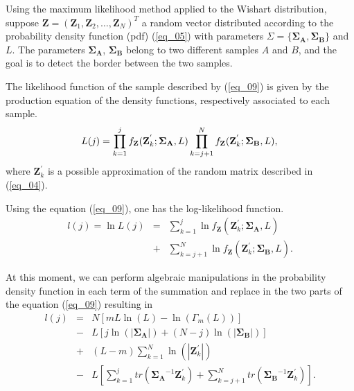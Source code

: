 \documentclass[conference]{IEEEtran}
\begin{document}
Using the maximum likelihood method applied to the Wishart distribution, suppose $\mathbf{Z}=(\mathbf{Z}_1,\mathbf{Z}_2,\dots,\mathbf{Z}_N)^T$ a random vector distributed according to the probability density function (pdf) (\ref{eq_05}) with parameters $\Sigma=\{\mathbf{\Sigma_A}, \mathbf{\Sigma_B}\}$ and $L$. The parameters $\mathbf{\Sigma_A}$, $\mathbf{\Sigma_B}$ belong to two different samples $A$ and $B$, and the goal is to detect the border between the two samples.

The likelihood function of the sample described by (\ref{eq_09}) is given by the production equation of the density functions, respectively associated to each sample.
\begin{equation}\label{eq_10}
	L(j)=\prod_{k=1}^{j}f_{\mathbf{Z}}(\mathbf{Z}_{k}^{'};\mathbf{\Sigma_{A}},L) \prod_{k=j+1}^{N}f_{\mathbf{Z}}(\mathbf{Z}_{k}^{'};\mathbf{\Sigma_{B}},L), \\
\end{equation}
where $\mathbf{Z}_{k}^{'}$ is a possible approximation of the random matrix described in (\ref{eq_04}).

Using the equation (\ref{eq_09}), one has the log-likelihood function.
\begin{equation}
\begin{array}{rcl}\label{eq_11}
	l(j)=\ln L(j)&=&\sum_{k=1}^{j}\ln f_{\mathbf{Z}}(\mathbf{Z}_{k}^{'};\mathbf{\Sigma_{A}},L)\\
	             &+&\sum_{k=j+1}^{N}\ln f_{\mathbf{Z}}(\mathbf{Z}_{k}^{'};\mathbf{\Sigma_{B}},L).
\end{array}
\end{equation}

At this moment, we can perform algebraic manipulations in the probability density function in each term of the summation and replace in the two parts of the equation (\ref{eq_09}) resulting in
\begin{equation}
\begin{array}{lll}\label{eq_12}
	l(j)&=&N\left[mL\ln{\left(L\right)}-\ln{\left(\Gamma_m(L)\right)}\right]\\
	&-& L\left[j\ln{\left(|\mathbf{\Sigma_{A}}|\right)}+(N-j)\ln{\left(|\mathbf{\Sigma_{B}}|\right)}\right] \\
	&+&(L-m)\sum_{k=1}^{N}\ln{\left(|\mathbf{Z}_{k}^{'}|\right)}\\
	&-&L\left[\sum_{k=1}^{j}tr(\mathbf{\Sigma_{A}}^{-1}\mathbf{Z}_{k}^{'})+ \sum_{k=j+1}^{N}tr(\mathbf{\Sigma_{B}}^{-1}\mathbf{Z}_{k}^{'})\right]. \\
\end{array}
\end{equation}
\end{document}
